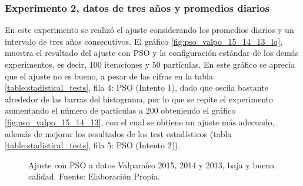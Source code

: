 \subsubsection{Experimento 2, datos de tres años y promedios diarios}
En este experimento se realizó el ajuste considerando los promedios diarios y un intervalo de tres años consecutivos. El gráfico \ref{fig:pso_valpo_15_14_13_lq}, muestra el resultado del ajuste con PSO y la configuración estándar de los demás experimentos, es decir, 100 iteraciones y 50 partículas. En este gráfico se aprecia que el ajuste no es bueno, a pesar de las cifras en la tabla \ref{table:stadistical_tests}, fila 4: PSO (Intento 1), dado que oscila bastante alrededor de las barras del histograma, por lo que se repite el experimento aumentando el número de partículas a 200 obteniendo el gráfico \ref{fig:pso_valpo_15_14_13}, con el cual se obtiene un ajuste más adecuado, además de mejorar los resultados de los test estadísticos (tabla \ref{table:stadistical_tests}, fila 5: PSO (Intento 2)).\\
\begin{figure}[ht!]
    \centering
    \caption{Ajuste con PSO a datos Valparaíso 2015, 2014 y 2013, baja y buena calidad. Fuente: Elaboración Propia.}
    \label{fig:subfigures}
\end{figure}

